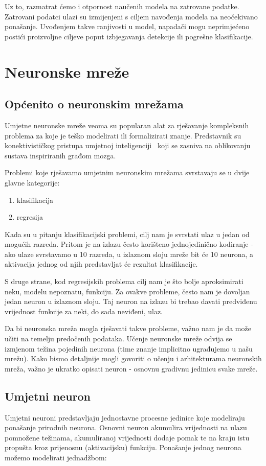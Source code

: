 \documentclass[times, utf8, zavrsni, numeric]{fer}
\begin{document}
Uz to, razmatrat ćemo i otpornost naučenih modela na zatrovane podatke. Zatrovani podatci ulazi su izmijenjeni s ciljem navođenja modela na neočekivano ponašanje. 
Uvođenjem takve ranjivosti u model, napadači mogu neprimjećeno postići proizvoljne ciljeve poput izbjegavanja detekcije ili pogrešne klasifikacije.

\chapter{Neuronske mreže}
\section{Općenito o neuronskim mrežama}
Umjetne neuronske mreže veoma su popularan alat za rješavanje kompleksnih problema za koje je teško modelirati ili formalizirati znanje. 
Predstavnik su konektivističkog pristupa umjetnoj inteligenciji~\cite{uui2020} koji se zasniva na oblikovanju sustava inspiriranih građom mozga.

Problemi koje rješavamo umjetnim neuronskim mrežama svrstavaju se u dvije glavne kategorije:
\begin{enumerate}
    \item klasifikacija 
    \item regresija
\end{enumerate}

Kada su u pitanju klasifikacijski problemi, cilj nam je svrstati ulaz u jedan od mogućih razreda. 
Pritom je na izlazu često korišteno jednojedinično kodiranje - ako ulaze svrstavamo u 10 razreda, u izlaznom sloju mreže bit će 10 neurona, a aktivacija jednog od njih predstavljat će rezultat klasifikacije.

S druge strane, kod regresijskih problema cilj nam je što bolje aproksimirati neku, modelu nepoznatu, funkciju. Za ovakve probleme, često nam je dovoljan jedan neuron u izlaznom sloju. 
Taj neuron na izlazu bi trebao davati predviđenu vrijednost funkcije za neki, do sada neviđeni, ulaz.

Da bi neuronska mreža mogla rješavati takve probleme, važno nam je da može učiti na temelju predočenih podataka. Učenje neuronske mreže odvija se izmjenom težina pojedinih neurona (time znanje implicitno ugrađujemo u našu mrežu).
Kako bismo detaljnije mogli govoriti o učenju i arhitekturama neuronskih mreža, važno je ukratko opisati neuron - osnovnu gradivnu jedinicu svake mreže.
\pagebreak
\section{Umjetni neuron}
Umjetni neuroni predstavljaju jednostavne procesne jedinice koje modeliraju ponašanje prirodnih neurona. Osnovni neuron akumulira vrijednosti na ulazu pomnožene težinama, 
akumuliranoj vrijednosti dodaje pomak te na kraju istu propušta kroz prijenosnu (aktivacijsku) funkciju. Ponašanje jednog neurona možemo modelirati jednadžbom:
\end{document}

